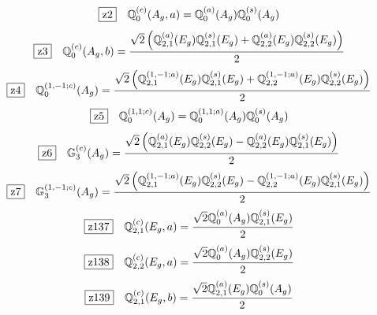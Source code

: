\documentclass[fleqn,10pt,landscape]{jsarticle}
\begin{document}
\begin{dmath*}
\hspace*{3mm}\fbox{z2}\quad \mathbb{Q}_{0}^{(c)}(A_{g},a)=\mathbb{Q}_{0}^{(a)}(A_{g}) \mathbb{Q}_{0}^{(s)}(A_{g})
\end{dmath*}
\begin{dmath*}
\hspace*{3mm}\fbox{z3}\quad \mathbb{Q}_{0}^{(c)}(A_{g},b)=\frac{\sqrt{2} \left(\mathbb{Q}_{2,1}^{(a)}(E_{g}) \mathbb{Q}_{2,1}^{(s)}(E_{g}) + \mathbb{Q}_{2,2}^{(a)}(E_{g}) \mathbb{Q}_{2,2}^{(s)}(E_{g})\right)}{2}
\end{dmath*}
\begin{dmath*}
\hspace*{3mm}\fbox{z4}\quad \mathbb{Q}_{0}^{(1,-1;c)}(A_{g})=\frac{\sqrt{2} \left(\mathbb{Q}_{2,1}^{(1,-1;a)}(E_{g}) \mathbb{Q}_{2,1}^{(s)}(E_{g}) + \mathbb{Q}_{2,2}^{(1,-1;a)}(E_{g}) \mathbb{Q}_{2,2}^{(s)}(E_{g})\right)}{2}
\end{dmath*}
\begin{dmath*}
\hspace*{3mm}\fbox{z5}\quad \mathbb{Q}_{0}^{(1,1;c)}(A_{g})=\mathbb{Q}_{0}^{(1,1;a)}(A_{g}) \mathbb{Q}_{0}^{(s)}(A_{g})
\end{dmath*}
\begin{dmath*}
\hspace*{3mm}\fbox{z6}\quad \mathbb{G}_{3}^{(c)}(A_{g})=\frac{\sqrt{2} \left(\mathbb{Q}_{2,1}^{(a)}(E_{g}) \mathbb{Q}_{2,2}^{(s)}(E_{g}) - \mathbb{Q}_{2,2}^{(a)}(E_{g}) \mathbb{Q}_{2,1}^{(s)}(E_{g})\right)}{2}
\end{dmath*}
\begin{dmath*}
\hspace*{3mm}\fbox{z7}\quad \mathbb{G}_{3}^{(1,-1;c)}(A_{g})=\frac{\sqrt{2} \left(\mathbb{Q}_{2,1}^{(1,-1;a)}(E_{g}) \mathbb{Q}_{2,2}^{(s)}(E_{g}) - \mathbb{Q}_{2,2}^{(1,-1;a)}(E_{g}) \mathbb{Q}_{2,1}^{(s)}(E_{g})\right)}{2}
\end{dmath*}
\begin{dmath*}
\hspace*{3mm}\fbox{z137}\quad \mathbb{Q}_{2,1}^{(c)}(E_{g},a)=\frac{\sqrt{2} \mathbb{Q}_{0}^{(a)}(A_{g}) \mathbb{Q}_{2,1}^{(s)}(E_{g})}{2}
\end{dmath*}
\begin{dmath*}
\hspace*{3mm}\fbox{z138}\quad \mathbb{Q}_{2,2}^{(c)}(E_{g},a)=\frac{\sqrt{2} \mathbb{Q}_{0}^{(a)}(A_{g}) \mathbb{Q}_{2,2}^{(s)}(E_{g})}{2}
\end{dmath*}
\begin{dmath*}
\hspace*{3mm}\fbox{z139}\quad \mathbb{Q}_{2,1}^{(c)}(E_{g},b)=\frac{\sqrt{2} \mathbb{Q}_{2,1}^{(a)}(E_{g}) \mathbb{Q}_{0}^{(s)}(A_{g})}{2}
\end{dmath*}
\end{document}
